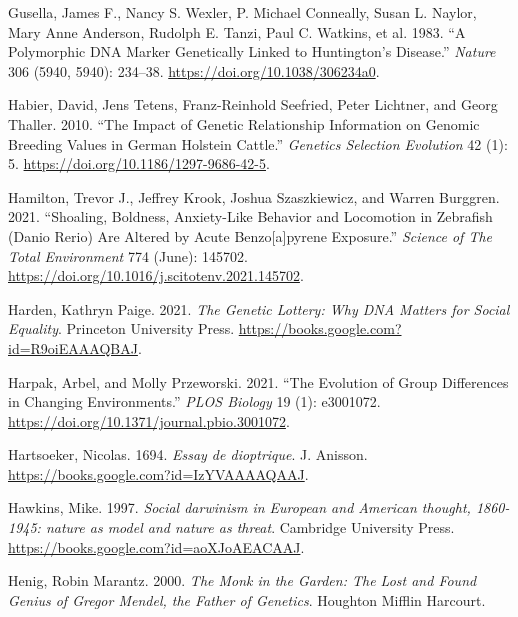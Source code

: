\documentclass[
]{book}
\newlength{\cslhangindent}
\newlength{\cslentryspacingunit} %
\newenvironment{CSLReferences}[2] %
 {%
  \setlength{\parindent}{0pt}
  \ifodd #1
  \let\oldpar\par
  \def\par{\hangindent=\cslhangindent\oldpar}
  \fi
  \setlength{\parskip}{#2\cslentryspacingunit}
 }%
 {}
\begin{document}
\begin{CSLReferences}{1}{0}
\leavevmode{}%
Gusella, James F., Nancy S. Wexler, P. Michael Conneally, Susan L. Naylor, Mary Anne Anderson, Rudolph E. Tanzi, Paul C. Watkins, et al. 1983. {``A Polymorphic {DNA} Marker Genetically Linked to {Huntington}'s Disease.''} \emph{Nature} 306 (5940, 5940): 234--38. \url{https://doi.org/10.1038/306234a0}.

\leavevmode{}%
Habier, David, Jens Tetens, Franz-Reinhold Seefried, Peter Lichtner, and Georg Thaller. 2010. {``The Impact of Genetic Relationship Information on Genomic Breeding Values in {German Holstein} Cattle.''} \emph{Genetics Selection Evolution} 42 (1): 5. \url{https://doi.org/10.1186/1297-9686-42-5}.

\leavevmode{}%
Hamilton, Trevor J., Jeffrey Krook, Joshua Szaszkiewicz, and Warren Burggren. 2021. {``Shoaling, Boldness, Anxiety-Like Behavior and Locomotion in Zebrafish ({Danio} Rerio) Are Altered by Acute Benzo{[}a{]}pyrene Exposure.''} \emph{Science of The Total Environment} 774 (June): 145702. \url{https://doi.org/10.1016/j.scitotenv.2021.145702}.

\leavevmode{}%
Harden, Kathryn Paige. 2021. \emph{The {Genetic Lottery}: {Why DNA Matters} for {Social Equality}}. {Princeton University Press}. \url{https://books.google.com?id=R9oiEAAAQBAJ}.

\leavevmode{}%
Harpak, Arbel, and Molly Przeworski. 2021. {``The Evolution of Group Differences in Changing Environments.''} \emph{PLOS Biology} 19 (1): e3001072. \url{https://doi.org/10.1371/journal.pbio.3001072}.

\leavevmode{}%
Hartsoeker, Nicolas. 1694. \emph{Essay de dioptrique}. {J. Anisson}. \url{https://books.google.com?id=IzYVAAAAQAAJ}.

\leavevmode{}%
Hawkins, Mike. 1997. \emph{Social darwinism in European and American thought, 1860-1945: nature as model and nature as threat}. {Cambridge University Press}. \url{https://books.google.com?id=aoXJoAEACAAJ}.

\leavevmode{}%
Henig, Robin Marantz. 2000. \emph{The {Monk} in the {Garden}: {The Lost} and {Found Genius} of {Gregor Mendel}, the {Father} of {Genetics}}. {Houghton Mifflin Harcourt}.


\end{CSLReferences}
\end{document}
